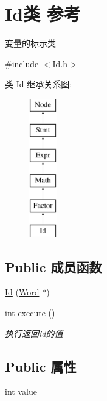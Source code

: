 \hypertarget{class_id}{}\section{Id类 参考}
\label{class_id}


变量的标示类  




{\ttfamily \#include $<$Id.\+h$>$}

类 Id 继承关系图\+:\begin{figure}[H]
\begin{center}
\leavevmode
\includegraphics[height=6.000000cm]{class_id}
\end{center}
\end{figure}
\subsection*{Public 成员函数}
\begin{DoxyCompactItemize}
\item 
\hyperlink{class_id_a22122a40c4a61b6d2f7d20a3cc7c7275}{Id} (\hyperlink{class_word}{Word} $\ast$)
\item 
\mbox{\label{class_id_ae43a9ffecbbc0ac4fd041b8e8e3c3de0}} 
int \hyperlink{class_id_ae43a9ffecbbc0ac4fd041b8e8e3c3de0}{execute} ()
\begin{DoxyCompactList}\small\item\em 执行返回id的值 \end{DoxyCompactList}\end{DoxyCompactItemize}
\subsection*{Public 属性}
\begin{DoxyCompactItemize}
\item 
int \hyperlink{class_id_af7f7ed479b45ce150b88481b7b996e32}{value}
\end{DoxyCompactItemize}

